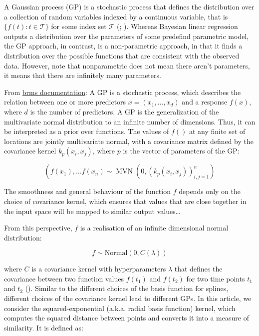 \documentclass[
  doc,
  floatsintext,
  longtable,
  a4paper,
  nolmodern,
  notxfonts,
  notimes,
  colorlinks=true,linkcolor=blue,citecolor=blue,urlcolor=blue]{apa7}
\begin{document}
A Gaussian process (GP) is a stochastic process that defines the
distribution over a collection of random variables indexed by a
continuous variable, that is \(\{f(t): t \in \mathcal{T}\}\) for some
index set \(\mathcal{T}\) (;
). Whereas Bayesian linear regression outputs a distribution over
the parameters of some predefind parametric model, the GP approach, in
contrast, is a non-parametric approach, in that it finds a distribution
over the possible functions that are consistent with the observed data.
However, note that nonparametric does not mean there aren't parameters,
it means that there are infinitely many parameters.

From
\href{https://www.rdocumentation.org/packages/brms/versions/2.22.0/topics/gp}{brms
documentation}: A GP is a stochastic process, which describes the
relation between one or more predictors
\(x=\left(x_{1}, \ldots, x_{d}\right)\) and a response \(f(x)\), where
\(d\) is the number of predictors. A GP is the generalization of the
multivariate normal distribution to an infinite number of dimensions.
Thus, it can be interpreted as a prior over functions. The values of
\(f()\) at any finite set of locations are jointly multivariate normal,
with a covariance matrix defined by the covariance kernel
\(k_p\left(x_i, x_j\right)\), where \(p\) is the vector of parameters of
the GP:

\[
\left(f\left(x_{1}\right), \ldots f\left(x_{n}\right) \sim \operatorname{MVN}\left(0, \left(k_p\left(x_{i}, x_{j}\right)\right)_{i, j=1}^{n}\right)\right.
\]

The smoothness and general behaviour of the function \(f\) depends only
on the choice of covariance kernel, which ensures that values that are
close together in the input space will be mapped to similar output
values\ldots{}

From this perspective, \(f\) is a realisation of an infinite dimensional
normal distribution:

\[
f \sim \mathrm{Normal}(0, C(\lambda))
\]

where \(C\) is a covariance kernel with hyperparameters \(\lambda\) that
defines the covariance between two function values \(f\left(t_1\right)\)
and \(f\left(t_2\right)\) for two time points \(t_1\) and \(t_2\)
(). Similar to
the different choices of the basis function for splines, different
choices of the covariance kernel lead to different GPs. In this article,
we consider the squared-exponential (a.k.a. radial basis function)
kernel, which computes the squared distance between points and converts
it into a measure of similarity. It is defined as:
\end{document}

